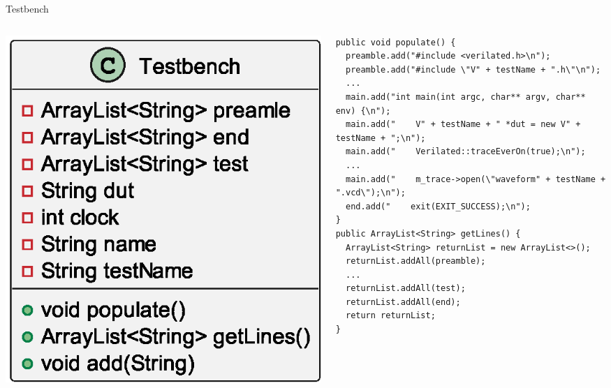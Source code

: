 \documentclass[aspectratio=169, handout]{beamer}
\begin{document}
\begin{frame}[containsverbatim]{Testbench}
    \begin{columns}[T]
        \begin{column}{.2\textwidth}
            \includegraphics[width=\columnwidth]{out/plantuml/TestbenchClass/TestbenchClass.eps}
        \end{column}
        \begin{column}{.8\textwidth}
            \begin{verbatim}
public void populate() {
  preamble.add("#include <verilated.h>\n");
  preamble.add("#include \"V" + testName + ".h\"\n");
  ...
  main.add("int main(int argc, char** argv, char** env) {\n");
  main.add("    V" + testName + " *dut = new V" + testName + ";\n");
  main.add("    Verilated::traceEverOn(true);\n");
  ...
  main.add("    m_trace->open(\"waveform" + testName + ".vcd\");\n");
  end.add("    exit(EXIT_SUCCESS);\n");
}
public ArrayList<String> getLines() {
  ArrayList<String> returnList = new ArrayList<>();
  returnList.addAll(preamble);
  ...
  returnList.addAll(test);
  returnList.addAll(end);
  return returnList;
}
            \end{verbatim}
        \end{column}
    \end{columns}
\end{frame}
\end{document}

